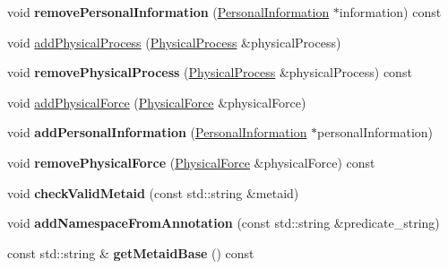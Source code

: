\begin{DoxyCompactItemize}
\item 
\mbox{\label{classomexmeta_1_1Editor_a8be7fa01bef49ff1c93965781797c9bc}} 
void {\bfseries remove\+Personal\+Information} (\hyperlink{classomexmeta_1_1PersonalInformation}{Personal\+Information} $\ast$information) const
\item 
void \hyperlink{classomexmeta_1_1Editor_ae4a608ecbe64f05c1b64efbeeb1fdeb1}{add\+Physical\+Process} (\hyperlink{classomexmeta_1_1PhysicalProcess}{Physical\+Process} \&physical\+Process)
\item 
\mbox{\label{classomexmeta_1_1Editor_a42640d74c6afe780738c906bdf346a78}} 
void {\bfseries remove\+Physical\+Process} (\hyperlink{classomexmeta_1_1PhysicalProcess}{Physical\+Process} \&physical\+Process) const
\item 
void \hyperlink{classomexmeta_1_1Editor_a7833e03995f6323109c2db8d59104f6c}{add\+Physical\+Force} (\hyperlink{classomexmeta_1_1PhysicalForce}{Physical\+Force} \&physical\+Force)
\item 
\mbox{\label{classomexmeta_1_1Editor_a1b2e0f5859fe2e2784ecff2a78f7f1f8}} 
void {\bfseries add\+Personal\+Information} (\hyperlink{classomexmeta_1_1PersonalInformation}{Personal\+Information} $\ast$personal\+Information)
\item 
\mbox{\label{classomexmeta_1_1Editor_ad99187ec52bef1af440af5d9560f32c5}} 
void {\bfseries remove\+Physical\+Force} (\hyperlink{classomexmeta_1_1PhysicalForce}{Physical\+Force} \&physical\+Force) const
\item 
\mbox{\label{classomexmeta_1_1Editor_a790458ef32f01ce0a6fd87bf14bed81a}} 
void {\bfseries check\+Valid\+Metaid} (const std\+::string \&metaid)
\item 
\mbox{\label{classomexmeta_1_1Editor_a3fef7f1c38949b50239a9a07cc327d67}} 
void {\bfseries add\+Namespace\+From\+Annotation} (const std\+::string \&predicate\+\_\+string)
\item 
\mbox{\label{classomexmeta_1_1Editor_af987e450e4bf9d75391ad3f5ac6233f6}} 
const std\+::string \& {\bfseries get\+Metaid\+Base} () const
\item 

\end{DoxyCompactItemize}
